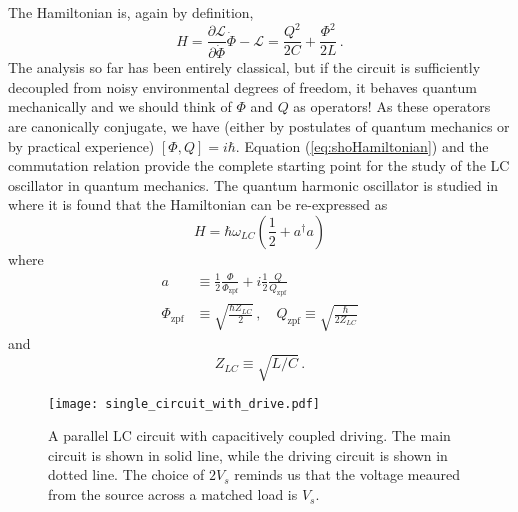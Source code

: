 The Hamiltonian is, again by definition,
\begin{equation}
H = \frac{\partial \mathcal{L}}{\partial \dot{\Phi}} \dot{\Phi} - \mathcal{L}
= \frac{Q^2}{2C} + \frac{\Phi^2}{2L} \, . \label{eq:shoHamiltonian}
\end{equation}
The analysis so far has been entirely classical, but if the circuit is sufficiently decoupled from noisy environmental degrees of freedom, it behaves quantum mechanically and we should think of $\Phi$ and $Q$ as operators!
As these operators are canonically conjugate, we have (either by postulates of quantum mechanics or by practical experience) $[\Phi,Q]=i\hbar$.
Equation (\ref{eq:shoHamiltonian}) and the commutation relation provide the complete starting point for the study of the LC oscillator in quantum mechanics.
The quantum harmonic oscillator is studied in \citeinternaltype {} where it is found that the Hamiltonian can be re-expressed as
\begin{equation}
H = \hbar \omega_{LC} \left( \frac{1}{2} + a^\dagger a \right)
\end{equation}
where
\begin{align}
  a &\equiv
      \frac{1}{2} \frac{\Phi}{\Phi_\text{zpf}}
  + i \frac{1}{2} \frac{Q}{Q_\text{zpf}} \\
  \Phi_\text{zpf} &\equiv \sqrt{\frac{\hbar Z_{LC}}{2}} \, , \quad
  Q_\text{zpf} \equiv \sqrt{\frac{\hbar}{2 Z_{LC}}}
\end{align}
and
\begin{equation}
Z_{LC} \equiv \sqrt{L/C} \, .
\end{equation}

\begin{figure}
\begin{centering}
\texttt{[image: single\_circuit\_with\_drive.pdf]} 
\par\end{centering}
  \caption{A parallel LC circuit with capacitively coupled driving. The main circuit is shown in solid line, while the driving circuit is shown in dotted line. The choice of $2V_s$ reminds us that the voltage meaured from the source across a matched load is $V_s$.}
\label{Fig:singleCircuit}
\end{figure}

